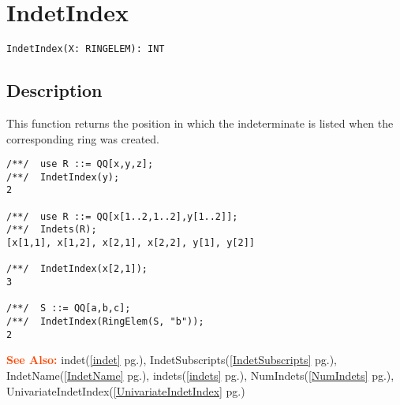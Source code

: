 \documentclass[a4paper]{mybook}
\newenvironment{command}{}{} %
\newcommand\SeeAlso{\par\textcolor{OrangeRed}{\textbf{\large See Also: }}}
\begin{document}
\section{IndetIndex}
\label{IndetIndex}
\begin{command} %


\begin{Verbatim}[label=syntax, rulecolor=\color{MidnightBlue},
frame=single]
IndetIndex(X: RINGELEM): INT
\end{Verbatim}


\subsection*{Description}

This function returns the position in which the indeterminate is
listed when the corresponding ring was created.
\begin{Verbatim}[label=example, rulecolor=\color{PineGreen}, frame=single]
/**/  use R ::= QQ[x,y,z];
/**/  IndetIndex(y);
2

/**/  use R ::= QQ[x[1..2,1..2],y[1..2]];
/**/  Indets(R);
[x[1,1], x[1,2], x[2,1], x[2,2], y[1], y[2]]

/**/  IndetIndex(x[2,1]);
3

/**/  S ::= QQ[a,b,c];
/**/  IndetIndex(RingElem(S, "b"));
2
\end{Verbatim}


\SeeAlso %
  indet(\ref{indet} pg.\pageref{indet}), 
    IndetSubscripts(\ref{IndetSubscripts} pg.\pageref{IndetSubscripts}), 
    IndetName(\ref{IndetName} pg.\pageref{IndetName}), 
    indets(\ref{indets} pg.\pageref{indets}), 
    NumIndets(\ref{NumIndets} pg.\pageref{NumIndets}), 
    UnivariateIndetIndex(\ref{UnivariateIndetIndex} pg.\pageref{UnivariateIndetIndex})
\end{command} %
\end{document}
